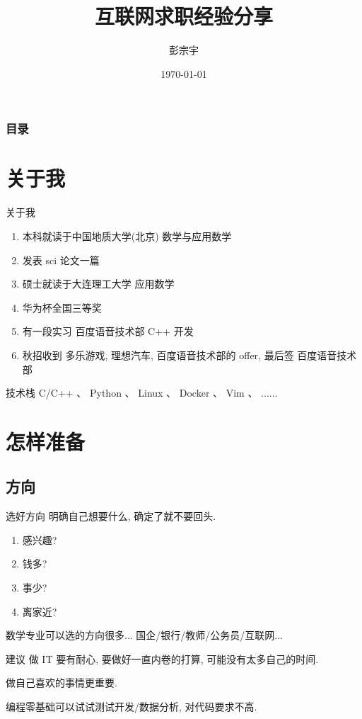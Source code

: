 \documentclass{ctexbeamer}
\title[互联网求职经验分享]{互联网求职经验分享}
\author[彭宗宇]{彭宗宇}
\institute[DLUT]{%
	大连理工大学
}
\date{\today}
\begin{document}
\maketitle

\begin{frame}
	\frametitle{\textbf{目录}}
	\tableofcontents
\end{frame}


\section{关于我}
\begin{frame}{关于我}
	\begin{enumerate}[<+-| alert@+>]
		\item 本科就读于中国地质大学(北京) 数学与应用数学
		\item 发表 sci 论文一篇
		\item 硕士就读于大连理工大学  应用数学
		\item 华为杯全国三等奖
		\item 有一段实习 百度语音技术部 C++ 开发
		\item 秋招收到 多乐游戏, 理想汽车, 百度语音技术部的 offer,  最后签 百度语音技术部
	\end{enumerate}

	\begin{block}{技术栈}
		C/C++ 、 Python 、 Linux 、 Docker 、 Vim 、 ......
	\end{block}
\end{frame}







\section{怎样准备}


\subsection{方向}
\begin{frame}{选好方向}
	明确自己想要什么, 确定了就不要回头.
	\begin{enumerate}
		\item 感兴趣?
		\item 钱多?
		\item 事少?
		\item 离家近?
	\end{enumerate}

	数学专业可以选的方向很多... 国企/银行/教师/公务员/互联网...

	\begin{exampleblock}{建议}
		做 IT 要有耐心, 要做好一直内卷的打算, 
		可能没有太多自己的时间. 

		做自己喜欢的事情更重要. 

		编程零基础可以试试测试开发/数据分析, 对代码要求不高. 
	\end{exampleblock}
\end{frame}
\end{document}
